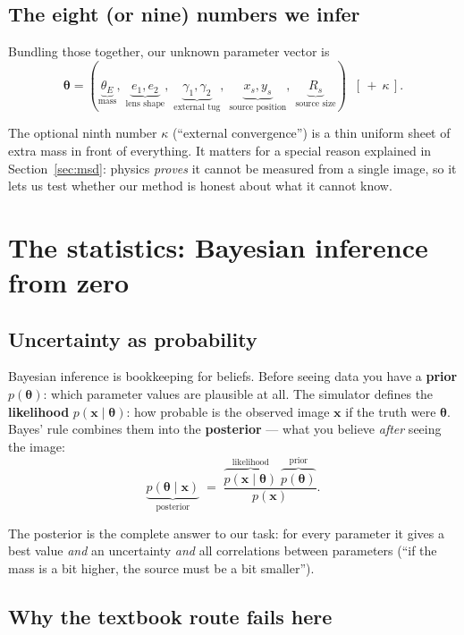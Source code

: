 \documentclass[11pt,a4paper]{article}
\begin{document}
\subsection{The eight (or nine) numbers we infer}

Bundling those together, our unknown parameter vector is
\[
\boldsymbol\theta = (\underbrace{\theta_E}_{\text{mass}},\;
\underbrace{e_1, e_2}_{\text{lens shape}},\;
\underbrace{\gamma_1, \gamma_2}_{\text{external tug}},\;
\underbrace{x_s, y_s}_{\text{source position}},\;
\underbrace{R_s}_{\text{source size}})
\;\;[\,+\ \kappa\,].
\]

The optional ninth number $\kappa$ (``external convergence'') is a thin uniform
sheet of extra mass in front of everything. It matters for a special reason
explained in Section~\ref{sec:msd}: physics \emph{proves} it cannot be measured
from a single image, so it lets us test whether our method is honest about what
it cannot know.

\section{The statistics: Bayesian inference from zero}

\subsection{Uncertainty as probability}

Bayesian inference is bookkeeping for beliefs. Before seeing data you have a
\textbf{prior} $p(\boldsymbol\theta)$: which parameter values are plausible at
all. The simulator defines the \textbf{likelihood}
$p(\mathbf{x} \mid \boldsymbol\theta)$: how probable is the observed image
$\mathbf{x}$ if the truth were $\boldsymbol\theta$. Bayes' rule combines them
into the \textbf{posterior} --- what you believe \emph{after} seeing the image:
\[
\underbrace{p(\boldsymbol\theta \mid \mathbf{x})}_{\text{posterior}}
\;=\;
\frac{\overbrace{p(\mathbf{x} \mid \boldsymbol\theta)}^{\text{likelihood}}
      \;\overbrace{p(\boldsymbol\theta)}^{\text{prior}}}
     {p(\mathbf{x})}.
\]

The posterior is the complete answer to our task: for every parameter it gives a
best value \emph{and} an uncertainty \emph{and} all correlations between
parameters (``if the mass is a bit higher, the source must be a bit smaller'').

\subsection{Why the textbook route fails here}
\end{document}
